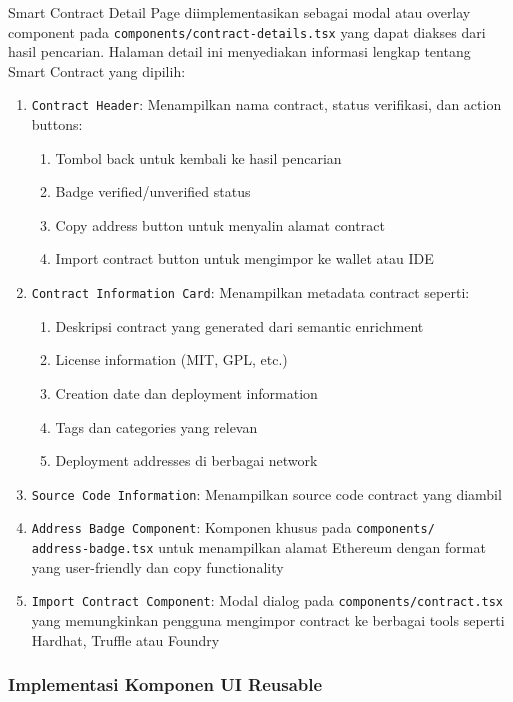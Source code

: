 Smart Contract Detail Page diimplementasikan sebagai modal atau overlay component pada \texttt{components/contract-details.tsx} yang dapat diakses dari hasil pencarian. Halaman detail ini menyediakan informasi lengkap tentang Smart Contract yang dipilih:

\begin{enumerate}
	\item \texttt{Contract Header}: Menampilkan nama contract, status verifikasi, dan action buttons:
	      \begin{enumerate}
		      \item Tombol back untuk kembali ke hasil pencarian
		      \item Badge verified/unverified status
		      \item Copy address button untuk menyalin alamat contract
		      \item Import contract button untuk mengimpor ke wallet atau IDE
	      \end{enumerate}
	\item \texttt{Contract Information Card}: Menampilkan metadata contract seperti:
	      \begin{enumerate}
		      \item Deskripsi contract yang generated dari semantic enrichment
		      \item License information (MIT, GPL, etc.)
		      \item Creation date dan deployment information
		      \item Tags dan categories yang relevan
		      \item Deployment addresses di berbagai network
	      \end{enumerate}
	\item \texttt{Source Code Information}: Menampilkan source code contract yang diambil
	\item \texttt{Address Badge Component}: Komponen khusus pada \texttt{components/\\address-badge.tsx} untuk menampilkan alamat Ethereum dengan format yang user-friendly dan copy functionality
	\item \texttt{Import Contract Component}: Modal dialog pada \texttt{components/\-contract.tsx} yang memungkinkan pengguna mengimpor contract ke berbagai tools seperti Hardhat, Truffle atau Foundry
\end{enumerate}

\subsubsection{Implementasi Komponen UI Reusable}


